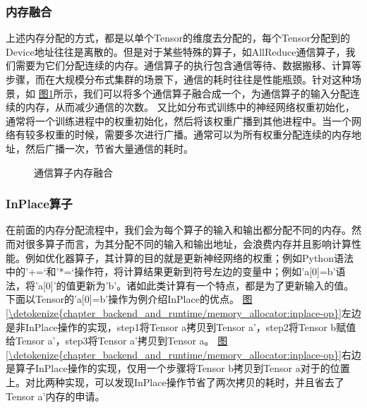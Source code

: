 \documentclass[letterpaper,10pt,english]{sphinxmanual}
\let\sphinxpxdimen\pdfpxdimen\else\newdimen\sphinxpxdimen
\begin{document}
\subsubsection{内存融合}
\label{\detokenize{chapter_backend_and_runtime/memory_allocator:id6}}
\sphinxAtStartPar
上述内存分配的方式，都是以单个Tensor的维度去分配的，每个Tensor分配到的Device地址往往是离散的。但是对于某些特殊的算子，如AllReduce通信算子，我们需要为它们分配连续的内存。通信算子的执行包含通信等待、数据搬移、计算等步骤，而在大规模分布式集群的场景下，通信的耗时往往是性能瓶颈。针对这种场景，如
\hyperref[\detokenize{chapter_backend_and_runtime/memory_allocator:memory-fusion}]{图\ref{\detokenize{chapter_backend_and_runtime/memory_allocator:memory-fusion}}}所示，我们可以将多个通信算子融合成一个，为通信算子的输入分配连续的内存，从而减少通信的次数。
又比如分布式训练中的神经网络权重初始化，通常将一个训练进程中的权重初始化，然后将该权重广播到其他进程中。当一个网络有较多权重的时候，需要多次进行广播。通常可以为所有权重分配连续的内存地址，然后广播一次，节省大量通信的耗时。

\begin{figure}[H]
\centering
\capstart

\noindent\sphinxincludegraphics[width=800\sphinxpxdimen]{{memory_fusion}.png}
\caption{通信算子内存融合}\label{\detokenize{chapter_backend_and_runtime/memory_allocator:id11}}\label{\detokenize{chapter_backend_and_runtime/memory_allocator:memory-fusion}}\end{figure}


\subsubsection{In\sphinxhyphen{}Place算子}
\label{\detokenize{chapter_backend_and_runtime/memory_allocator:in-place}}
\sphinxAtStartPar
在前面的内存分配流程中，我们会为每个算子的输入和输出都分配不同的内存。然而对很多算子而言，为其分配不同的输入和输出地址，会浪费内存并且影响计算性能。例如优化器算子，其计算的目的就是更新神经网络的权重；例如Python语法中的’+=‘和’*=‘操作符，将计算结果更新到符号左边的变量中；例如’a{[}0{]}=b’语法，将’a{[}0{]}’的值更新为’b’。诸如此类计算有一个特点，都是为了更新输入的值。下面以Tensor的’a{[}0{]}=b’操作为例介绍In\sphinxhyphen{}Place的优点。
\hyperref[\detokenize{chapter_backend_and_runtime/memory_allocator:inplace-op}]{图\ref{\detokenize{chapter_backend_and_runtime/memory_allocator:inplace-op}}}左边是非In\sphinxhyphen{}Place操作的实现，step1将Tensor
a拷贝到Tensor a’，step2将Tensor b赋值给Tensor a’，step3将Tensor
a’拷贝到Tensor a。
\hyperref[\detokenize{chapter_backend_and_runtime/memory_allocator:inplace-op}]{图\ref{\detokenize{chapter_backend_and_runtime/memory_allocator:inplace-op}}}右边是算子In\sphinxhyphen{}Place操作的实现，仅用一个步骤将Tensor
b拷贝到Tensor
a对于的位置上。对比两种实现，可以发现In\sphinxhyphen{}Place操作节省了两次拷贝的耗时，并且省去了Tensor
a’内存的申请。
\end{document}
